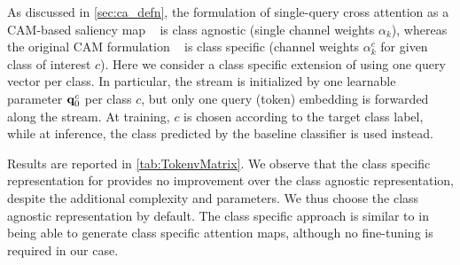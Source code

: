 As discussed in \autoref{sec:ca_defn}, the formulation of single-query cross attention as a 
CAM-based saliency map ~ is class agnostic (single channel weights $\alpha_k$), whereas the 
original CAM formulation ~ is class specific (channel weights $\alpha_k^c$ for given class 
of interest $c$). 
Here we consider a class specific extension of \Ours using one query vector per class. 
In particular, the stream is initialized by one learnable parameter $\mathbf{q}_0^c$ per class $c$, but 
only one query (\cls token) embedding is forwarded along the stream. At training, $c$ is chosen 
according to the target class label, while at inference, the class predicted by the baseline 
classifier is used instead.

Results are reported in \autoref{tab:TokenvMatrix}. We observe that the class specific 
representation for \Ours provides no improvement over the class agnostic representation, despite 
the additional complexity and parameters. We thus choose the class agnostic representation by 
default. The class specific approach is similar to \autocite{touvron2021augmenting} in being able to 
generate class specific attention maps, although no fine-tuning is required in our case. 

